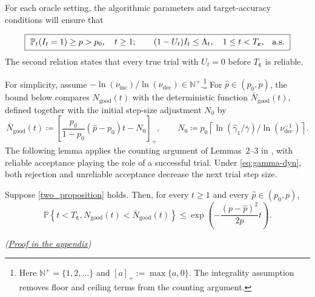 \documentclass{article}
\begin{document}
For each oracle setting, the algorithmic parameters  and target-accuracy
conditions will ensure that

\begin{equation}\label{two_proposition}
\boxed{~
\begin{aligned}
\mathbb P_t(I_t=1)\ge p>p_0,\quad
t\ge1;\qquad
(1-U_t)I_t\le\Lambda_t,\quad
1\le t<T_{\boldsymbol\varepsilon},
\end{aligned}\quad\textnormal{a.s.}~}
\end{equation}
The second relation states that every true trial with \(U_t=0\)
before \(T_{\boldsymbol\varepsilon}\) is reliable.

For simplicity, assume $-\ln(\nu_{\mathrm{inc}})/\ln(\nu_{\mathrm{dec}})\in\mathbb N^+$.\footnote{Here $\mathbb N^+=\{1,2,\ldots\}$ and $[a]_+:=\max\{a,0\}$. The integrality assumption removes floor and ceiling terms from the counting argument.} For \(\hat p\in(p_0,p)\), the bound below compares
\(N_{\mathrm{good}}(t)\) with the deterministic function
\(\bar N_{\mathrm{good}}(t)\), defined together with the initial
step-size adjustment \(N_0\) by
\begin{equation}\label{eq:N_good_envelope}
\textstyle
\bar N_{\mathrm{good}}(t)
\coloneqq 
\left[
\frac{p_0}{1-p_0}
(\hat p-p_0)t-N_0
\right]_+,
\qquad
N_0
\coloneqq 
p_0
\left\lceil
{
\ln(\hat\gamma_1/\bar\gamma)
}/{
\ln(\nu_{\mathrm{dec}}^{-1})
}
\right\rceil .
\end{equation}
The following lemma applies the counting argument of
Lemmas~2--3 in
\cite{scheinberg2025stochasticadaptiveoptimizationunreliable}, with reliable acceptance playing the role of a successful trial. 
Under \eqref{eq:gamma-dyn}, both rejection and unreliable acceptance decrease the next trial step size.
\begin{lemma}
\label{lem:good_step_growth}
Suppose \eqref{two_proposition} holds. Then, for every \(t\ge1\) and
every \(\hat p\in(p_0,p)\),
\begingroup{}
\begin{equation}\label{eq:good_step_count}
\textstyle
\mathbb P\left\{
t<T_{\boldsymbol\varepsilon},
N_{\mathrm{good}}(t)<\bar N_{\mathrm{good}}(t)
\right\}
\le
\exp\left(
-\frac{(p-\hat p)^2}{2p}t
\right).
\end{equation}
\par\nobreak\hfill\textnormal{\small\itshape(\hyperref[proof:good_step_growth]{Proof in the appendix})}\par
\endgroup
\end{lemma}
\end{document}
